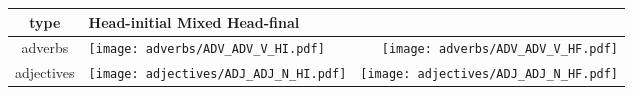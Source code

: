 \documentclass{article}
\begin{document}
\begin{table}[ht] 
   \begin{tabular}{c | l   r } \hline 
 type & \multicolumn{2}{l}{\hspace{0.5cm} Head-initial\hspace{2cm} Mixed\hspace{2.5cm} Head-final} \\
 \hline
 adverbs & \parbox[c]{14em}{\texttt{[image: adverbs/ADV\_ADV\_V\_HI.pdf]}} & \parbox[c]{14em}{\texttt{[image: adverbs/ADV\_ADV\_V\_HF.pdf]}} \\
adjectives & \parbox[c]{14em}{\texttt{[image: adjectives/ADJ\_ADJ\_N\_HI.pdf]}} & \parbox[c]{14em}{\texttt{[image: adjectives/ADJ\_ADJ\_N\_HF.pdf]}} \\
 \hline
  \end{tabular}
\end{table}
\end{document}

